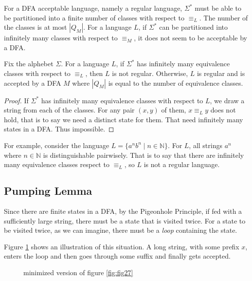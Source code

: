\documentclass[11pt]{article}
\begin{document}
For a DFA acceptable language, namely a regular language, $\Sigma^\ast$
must be able to be partitioned into a finite number of classes with
respect to $\equiv_L$. The number of the classes is at most $|Q_M|$.
For a language $L$, if $\Sigma^\ast$ can be partitioned into infinitely
many classes with respect to $\equiv_M$, it does not seem to be
acceptable by a DFA.

\begin{theorem}
Fix the alphebet $\Sigma$. For a language $L$, if $\Sigma^\ast$ has
infinitely many equivalence classes with respect to $\equiv_L$, then
$L$ is not regular. Otherwise, $L$ is regular and is accepted by a
DFA $M$ where $|Q_M|$ is equal to the number of equivalence classes.
\end{theorem}

\begin{proof}
If $\Sigma^\ast$ has infinitely many equivalence classes with respect to
$L$, we draw a string from each of the classes. For any pair $(x,y)$ of
them, $x \equiv_L y$ does not hold, that is to say we need a distinct
state for them. That need infinitely many states in a DFA. Thus
impossible.
\end{proof}

For example, consider the language $L = \{a^nb^n \mid n \in \mathbb{N}\}$.
For $L$, all strings $a^n$ where $n \in \mathbb{N}$ is distinguishable
pairwisely. That is to say that there are infinitely many equivalence
classes respect to $\equiv_L$, so $L$ is not a regular language.

\subsection{Pumping Lemma}

Since there are finite states in a DFA, by the Pigeonhole Principle, if
fed with a sufficiently large string, there must be a state that is
visited twice. For a state to be visited twice, as we can imagine, there
must be a \emph{loop} containing the state.

Figure \ref{fig:fig30} shows an illustration of this situation. A long
string, with some prefix $x$, enters the loop and then goes through some
suffix and finally gets accepted.

\begin{figure}[ht]
    \centering
    \caption{minimized version of figure \ref{fig:fig27}}
    \label{fig:fig30}
\end{figure}
\end{document}
